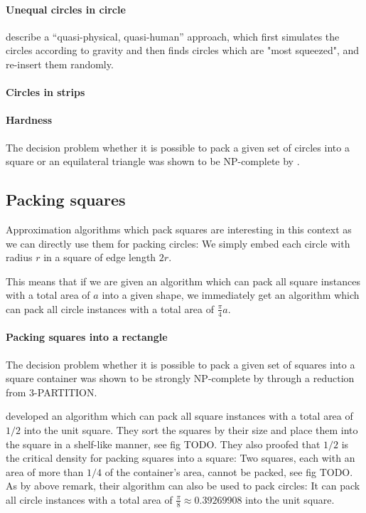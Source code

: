 \paragraph{Unequal circles in circle}

\textcite{WHZX2002improved} describe a “quasi-physical, quasi-human” approach, which first simulates the circles according to gravity and then finds circles which are "most squeezed", and re-insert them randomly.

\paragraph{Circles in strips}

\paragraph{Hardness}

The decision problem whether it is possible to pack a given set of circles into a square or an equilateral triangle was shown to be NP-complete by \textcite{DFL2010circle}.

\subsection{Packing squares}

Approximation algorithms which pack squares are interesting in this context as we can directly use them for packing circles: We simply embed each circle with radius $r$ in a square of edge length $2r$.

This means that if we are given an algorithm which can pack all square instances with a total area of $a$ into a given shape, we immediately get an algorithm which can pack all circle instances with a total area of $\frac{\pi}{4}a$.

\paragraph{Packing squares into a rectangle}

The decision problem whether it is possible to pack a given set of squares into a square container was shown to be strongly NP-complete by \textcite{LTWYC1990packing} through a reduction from \textsc{3-PARTITION}.

\textcite{MM1967some} developed an algorithm which can pack all square instances with a total area of $1/2$ into the unit square.
They sort the squares by their size and place them into the square in a shelf-like manner, see fig TODO.
They also proofed that $1/2$ is the critical density for packing squares into a square: Two squares, each with an area of more than $1/4$ of the container's area, cannot be packed, see fig TODO.
As by above remark, their algorithm can also be used to pack circles: It can pack all circle instances with a total area of $\frac{\pi}{8} \approx 0.39269908$ into the unit square.


